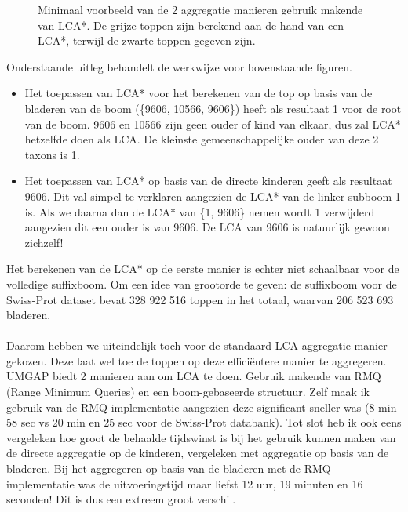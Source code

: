 \begin{figure}[H]
    \centering
    \hspace{0.25\textwidth}%
    \caption{Minimaal voorbeeld van de 2 aggregatie manieren gebruik makende van LCA*. De grijze toppen zijn berekend aan de hand van een LCA*, terwijl de zwarte toppen gegeven zijn.}\label{fig:lca*_diff}
\end{figure}

Onderstaande uitleg behandelt de werkwijze voor bovenstaande figuren.
\begin{itemize}
    \item Het toepassen van LCA* voor het berekenen van de top op basis van de bladeren van de boom (\{9606, 10566, 9606\}) heeft als resultaat 1 voor de root van de boom.
    9606 en 10566 zijn geen ouder of kind van elkaar, dus zal LCA* hetzelfde doen als LCA\@.
    De kleinste gemeenschappelijke ouder van deze 2 taxons is 1.
    \item Het toepassen van LCA* op basis van de directe kinderen geeft als resultaat 9606.
    Dit val simpel te verklaren aangezien de LCA* van de linker subboom 1 is.
    Als we daarna dan de LCA* van \{1, 9606\} nemen wordt 1 verwijderd aangezien dit een ouder is van 9606.
    De LCA van 9606 is natuurlijk gewoon zichzelf!
\end{itemize}

Het berekenen van de LCA* op de eerste manier is echter niet schaalbaar voor de volledige suffixboom.
Om een idee van grootorde te geven: de suffixboom voor de Swiss-Prot dataset bevat 328 922 516 toppen in het totaal, waarvan 206 523 693 bladeren.
\\ \\
Daarom hebben we uiteindelijk toch voor de standaard LCA aggregatie manier gekozen.
Deze laat wel toe de toppen op deze efficiëntere manier te aggregeren.
UMGAP biedt 2 manieren aan om LCA te doen.
Gebruik makende van RMQ (Range Minimum Queries) en een boom-gebaseerde structuur.
Zelf maak ik gebruik van de RMQ implementatie aangezien deze significant sneller was (8 min 58 sec vs 20 min en 25 sec voor de Swiss-Prot databank).
Tot slot heb ik ook eens vergeleken hoe groot de behaalde tijdswinst is bij het gebruik kunnen maken van de directe aggregatie op de kinderen, vergeleken met aggregatie op basis van de bladeren.
Bij het aggregeren op basis van de bladeren met de RMQ implementatie was de uitvoeringstijd maar liefst 12 uur, 19 minuten en 16 seconden!
Dit is dus een extreem groot verschil.

